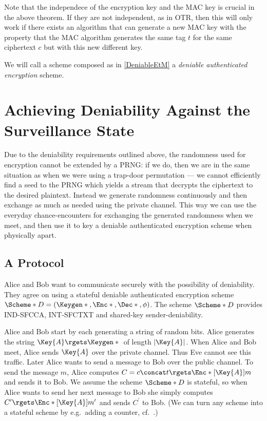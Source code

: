 Note that the independece of the encryption key and the \ac{MAC} key is crucial 
in the above theorem.
If they are not independent, as in \ac{OTR}, then this will only work if there 
exists an algorithm that can generate a new \ac{MAC} key with the property that 
the \ac{MAC} algorithm generates the same tag \(t\) for the same ciphertext 
\(c\) but with this new different key.

We will call a scheme composed as in \cref{DeniableEtM} a \emph{deniable 
  authenticated encryption} scheme.


\section{Achieving Deniability Against the Surveillance State}
\label{AchievingDeniability}

Due to the deniability requirements outlined above, the randomness used for 
encryption cannot be extended by a \ac{PRNG}: if we do, then we are in the same 
situation as when we were using a trap-door permutation --- we cannot 
efficiently find a seed to the \ac{PRNG} which yields a stream that decrypts 
the ciphertext to the desired plaintext.
Instead we generate randomness continuously and then exchange as much as needed 
using the private channel.
This way we can use the everyday chance-encounters for exchanging the generated 
randomness when we meet, and then use it to key a deniable authenticated 
encryption scheme when physically apart.

\subsection{A Protocol}
\label{TheProtocol}

Alice and Bob want to communicate securely with the possibility of deniability.
They agree on using a stateful deniable authenticated encryption scheme 
\(\Scheme*{D} = (\Keygen*{}, \Enc*{}, \Dec*{}, \phi)\).
The scheme \(\Scheme*{D}\) provides \ac{IND-SFCCA}, \ac{INT-SFCTXT} and 
shared-key sender-deniability.

Alice and Bob start by each generating a string of random bits.
Alice generates the string \(\Key{A}\rgets \Keygen*{}\) of length 
\(|\Key{A}|\).
When Alice and Bob meet, Alice sends \(\Key{A}\) over the private channel.
Thus Eve cannot see this traffic.
Later Alice wants to send a message to Bob over the public channel.
To send the message \(m\), Alice computes \(C = c\concat t\rgets 
  \Enc*[\Key{A}]{m}\) and sends it to Bob.
We assume the scheme \(\Scheme*{D}\) is stateful, so when Alice wants to send 
her next message to Bob she simply computes \(C^\prime\rgets \Enc*[\Key{A}]{ 
    m^\prime }\) and sends \(C^\prime\) to Bob.
(We can turn any scheme into a stateful scheme by e.g.\ adding a counter, 
cf.~\cite{StatefulDecryption}.)

